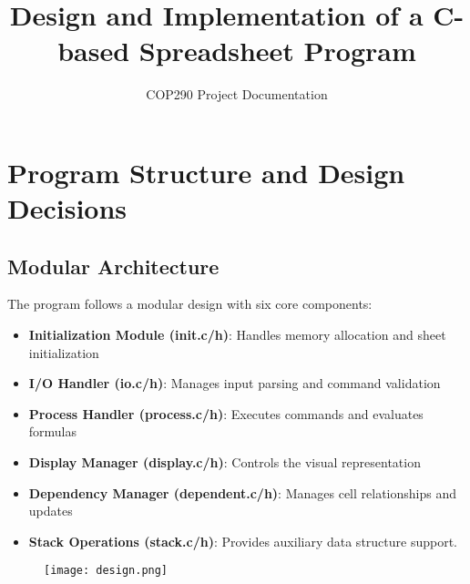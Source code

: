 \documentclass{article}
\title{Design and Implementation of a C-based Spreadsheet Program}
\author{COP290 Project Documentation}
\date{}
\begin{document}
\maketitle

\section{Program Structure and Design Decisions}

\subsection{Modular Architecture}
The program follows a modular design with six core components:
\begin{itemize}
    \item \textbf{Initialization Module (init.c/h)}: Handles memory allocation and sheet initialization
    \item \textbf{I/O Handler (io.c/h)}: Manages input parsing and command validation
    \item \textbf{Process Handler (process.c/h)}: Executes commands and evaluates formulas
    \item \textbf{Display Manager (display.c/h)}: Controls the visual representation
    \item \textbf{Dependency Manager (dependent.c/h)}: Manages cell relationships and updates
    \item \textbf{Stack Operations (stack.c/h)}: Provides auxiliary data structure support.
\end{itemize}

\begin{figure}
        \centering
        \texttt{[image: design.png]}
        \label{fig:enter-label}
\end{figure}
\end{document}
